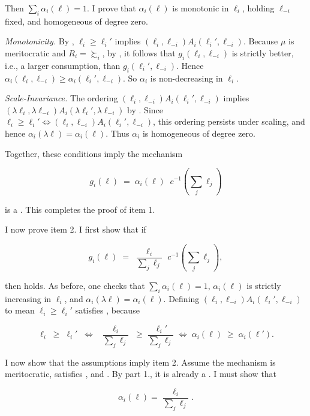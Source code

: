 \begin{propproof}
	Then 	\( \sum_i \alpha_i(\ell)=1\). I prove that \(\alpha_i(\ell)\) is monotonic in \(\ell_i\), holding \(\ell_{-i}\) fixed, and homogeneous of degree zero.

	\emph{Monotonicity.}
	By , \(\ell_i\ge\ell_i'\) implies \((\ell_i,\ell_{-i}) A_i (\ell_i',\ell_{-i})\). Because \(\mu\) is meritocratic and \(R_i=\succsim_i\), by , it follows that \(g_i(\ell_i,\ell_{-i})\) is strictly better, i.e., a larger consumption, than \(g_i(\ell_i',\ell_{-i})\). Hence
	\(\alpha_i(\ell_i,\ell_{-i}) \ge \alpha_i(\ell_i',\ell_{-i})\). So \(\alpha_i\) is non-decreasing in \(\ell_i\).

	\emph{Scale-Invariance.}
	The ordering \((\ell_i,\ell_{-i}) A_i (\ell_i',\ell_{-i})\) implies \((\lambda\ell_i,\lambda\ell_{-i}) A_i (\lambda\ell_i',\lambda\ell_{-i})\) by . Since \(\ell_i\ge\ell_i'\iff(\ell_i,\ell_{-i})A_i(\ell_i',\ell_{-i})\), this ordering persists under scaling, and hence \(\alpha_i(\lambda\ell)=\alpha_i(\ell)\). Thus \(\alpha_i\) is homogeneous of degree zero.

	Together, these conditions imply the mechanism

	\[
		g_i(\ell)
		\;=\;
		\alpha_i(\ell)\;\;c^{-1} \left(\sum_j \ell_j \right)
	\]

	is a . This completes the proof of item 1.

	I now prove item 2. I first show that if

	\[
		g_i(\ell)
		\;=\;
		\frac{\ell_i}{\sum_j \ell_j}\;c^{-1} \left(\sum_j \ell_j \right),
	\]

	then  holds. As before, one checks that \(\sum_i \alpha_i(\ell)=1\), \(\alpha_i(\ell)\) is strictly increasing in \(\ell_i\), and \(\alpha_i(\lambda\ell)=\alpha_i(\ell)\). Defining \((\ell_i,\ell_{-i}) A_i (\ell_i',\ell_{-i})\) to mean \(\ell_i\ge \ell_i'\) satisfies , because

	\[
		\ell_i\;\ge\;\ell_i'
		\;\;\Longleftrightarrow\;\;
		\frac{\ell_i}{\sum_j\ell_j}
		\;\ge\;\frac{\ell_i'}{\sum_j\ell_j}
		\;\Longleftrightarrow\;\alpha_i(\ell)\;\ge\;\alpha_i(\ell').
	\]

	I now show that the assumptions imply item 2. Assume the mechanism is meritocratic, satisfies ,  and . By part 1., it is already a . I must show that

	\[ \alpha_i(\ell)=\frac{\ell_i}{\sum_j \ell_j} . \]


\end{propproof}
